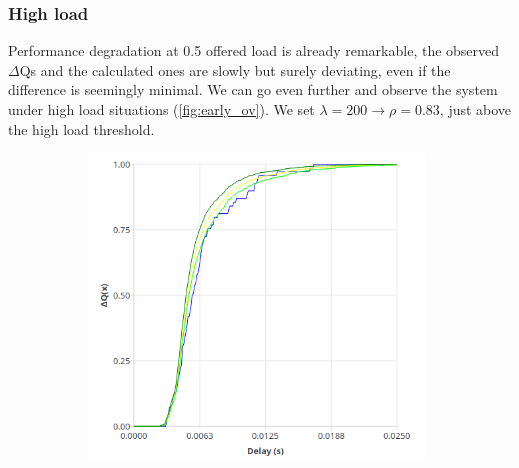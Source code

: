 \subsubsection{High load}
    Performance degradation at 0.5 offered load is already remarkable, the observed $\Delta$Qs and the calculated ones are slowly but surely deviating, even if the difference is seemingly minimal. We can go even further and observe the system under high load situations (\cref{fig:early_ov}). We set $\lambda = 200 \rightarrow \rho = 0.83$, just above the high load threshold.
    
       \begin{figure}[H]
            \centering
            \begin{subfigure}{.5\textwidth}
                \centering
                \includegraphics[width=0.98\textwidth]{img/overload_2/250_worker.png}
                \label{fig:high_load_1}
            \end{subfigure}%
            \begin{subfigure}{.5\textwidth}
                \centering

\end{subfigure}
\end{figure}
